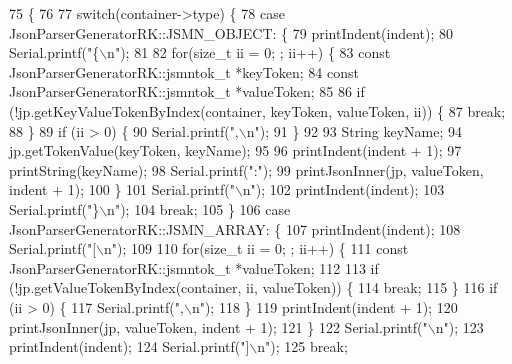 \begin{DoxyCode}
75                                                                                                     \{
76 
77     \textcolor{keywordflow}{switch}(container->type) \{
78     \textcolor{keywordflow}{case} JsonParserGeneratorRK::JSMN_OBJECT: \{
79         printIndent(indent);
80         Serial.printf(\textcolor{stringliteral}{"\{\(\backslash\)n"});
81 
82         \textcolor{keywordflow}{for}(\textcolor{keywordtype}{size\_t} ii = 0; ; ii++) \{
83             \textcolor{keyword}{const} JsonParserGeneratorRK::jsmntok_t *keyToken;
84             \textcolor{keyword}{const} JsonParserGeneratorRK::jsmntok_t *valueToken;
85 
86             \textcolor{keywordflow}{if} (!jp.getKeyValueTokenByIndex(container, keyToken, valueToken, ii)) \{
87                 \textcolor{keywordflow}{break};
88             \}
89             \textcolor{keywordflow}{if} (ii > 0) \{
90                 Serial.printf(\textcolor{stringliteral}{",\(\backslash\)n"});
91             \}
92 
93             String keyName;
94             jp.getTokenValue(keyToken, keyName);
95 
96             printIndent(indent + 1);
97             printString(keyName);
98             Serial.printf(\textcolor{stringliteral}{":"});
99             printJsonInner(jp, valueToken, indent + 1);
100         \}
101         Serial.printf(\textcolor{stringliteral}{"\(\backslash\)n"});
102         printIndent(indent);
103         Serial.printf(\textcolor{stringliteral}{"\}\(\backslash\)n"});
104         \textcolor{keywordflow}{break};
105     \}
106     \textcolor{keywordflow}{case} JsonParserGeneratorRK::JSMN_ARRAY: \{
107         printIndent(indent);
108         Serial.printf(\textcolor{stringliteral}{"[\(\backslash\)n"});
109 
110         \textcolor{keywordflow}{for}(\textcolor{keywordtype}{size\_t} ii = 0; ; ii++) \{
111             \textcolor{keyword}{const} JsonParserGeneratorRK::jsmntok_t *valueToken;
112 
113             \textcolor{keywordflow}{if} (!jp.getValueTokenByIndex(container, ii, valueToken)) \{
114                 \textcolor{keywordflow}{break};
115             \}
116             \textcolor{keywordflow}{if} (ii > 0) \{
117                 Serial.printf(\textcolor{stringliteral}{",\(\backslash\)n"});
118             \}
119             printIndent(indent + 1);
120             printJsonInner(jp, valueToken, indent + 1);
121         \}
122         Serial.printf(\textcolor{stringliteral}{"\(\backslash\)n"});
123         printIndent(indent);
124         Serial.printf(\textcolor{stringliteral}{"]\(\backslash\)n"});
125         \textcolor{keywordflow}{break};

\end{DoxyCode}
